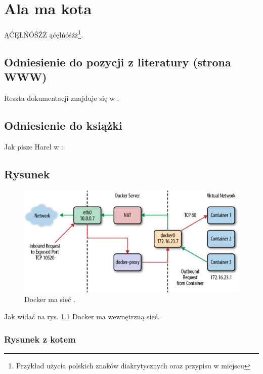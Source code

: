 
\chapter{Ala ma kota}

ĄĆĘŁŃÓŚŹŻ ąćęłńóśźż\footnote{Przykład użycia polskich znaków diakrytycznych oraz przypisu w miejscu}. \lipsum[1]

\section{Odniesienie do pozycji z literatury (strona WWW)}

Reszta dokumentacji znajduje się w \cite{docker_compose_reference}. \lipsum[3]

\section{Odniesienie do książki}

Jak pisze Harel w \cite{harel_rzecz_2008}: \lipsum[7]

\section{Rysunek}

\begin{figure}
\centering\includegraphics[width=.6\textwidth]{img/swarm-network}
\caption{Docker ma sieć \cite{docker_compose_reference}.}  \label{rys:network}%
\end{figure}

Jak widać na rys. \ref{rys:network} Docker ma wewnętrzną sieć. \lipsum[1]


\subsection{Rysunek z kotem}

